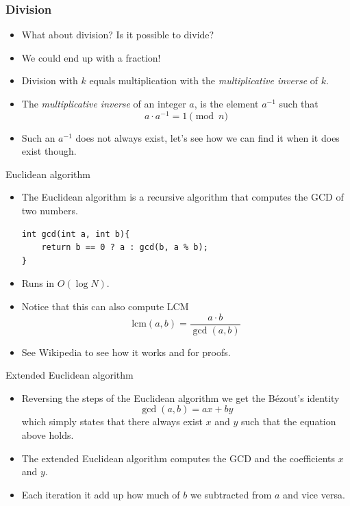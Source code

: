 \documentclass{beamer}
\begin{document}
\begin{frame}[plain]
  \frametitle{Division}
  \vspace{30pt}
  \begin{itemize}
    \item What about division? Is it possible to divide? 
    \item We could end up with a fraction!
    \item Division with $k$ equals multiplication with the \emph{multiplicative
      inverse} of $k$.
    \item The \emph{multiplicative inverse} of an integer $a$, is the element $a^{-1}$ such that
      \[
        a \cdot a^{-1} = 1 \pmod{n}
      \]
   \item<5-> Such an $a^{-1}$ does not always exist, let's see how we can find it when it does exist though.
  \end{itemize}
\end{frame}

\begin{frame}{Euclidean algorithm}
  \vspace{20pt}
  \begin{itemize}
    \item The Euclidean algorithm is a recursive algorithm that computes the GCD of two numbers.
      \begin{verbatim}
int gcd(int a, int b){
    return b == 0 ? a : gcd(b, a % b);
}
    \end{verbatim}
    \item Runs in $O(\log N)$.
    \item Notice that this can also compute LCM
      \[
        \text{lcm}(a, b) = \frac{a\cdot b}{\gcd(a,b)}
      \]
    \item See Wikipedia to see how it works and for proofs.
  \end{itemize}
\end{frame}

\begin{frame}[plain]{Extended Euclidean algorithm}
  \vspace{20pt}
  \begin{itemize}
    \item Reversing the steps of the Euclidean algorithm we get the B\'ezout's identity
      \[
        \gcd(a, b) = ax + by
      \]
    which simply states that there always exist $x$ and $y$ such that the equation above holds.
    \item The extended Euclidean algorithm computes the GCD and the coefficients $x$ and $y$.
    \item Each iteration it add up how much of $b$ we subtracted from $a$ and vice versa.
  \end{itemize}
\end{frame}
\end{document}
